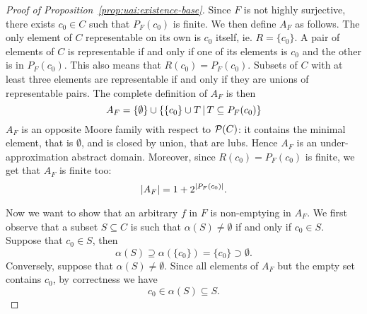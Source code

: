 \begin{proof}[Proof of Proposition~\ref{prop:uai:existence-base}]
	Since $F$ is not highly surjective, there exists $c_0 \in C$ such that $P_F(c_0)$ is finite. We then define $A_F$ as follows.
	The only element of $C$ representable on its own is $c_0$ itself, ie. $R = \{ c_0 \}$.
	A pair of elements of $C$ is representable if and only if one of its elements is $c_0$ and the other is in $P_F(c_0)$. This also means that $R(c_0) = P_F(c_0)$.
	Subsets of $C$ with at least three elements are representable if and only if they are unions of representable pairs.
	The complete definition of $A_F$ is then
	\begin{equation*}
		A_F = \{ \emptyset \} \cup \{ \{ c_0 \} \cup T \,\vert\, T \subseteq P_F(c_0) \}
	\end{equation*}
	$A_F$ is an opposite Moore family with respect to $\mathcal{P}(C)$: it contains the minimal element, that is $\emptyset$, and is closed by union, that are lubs. Hence $A_F$ is an under-approximation abstract domain.
	Moreover, since $R(c_0) = P_F(c_0)$ is finite, we get that $A_F$ is finite too:
	\begin{equation*}
		\lvert A_F\rvert = 1 + 2^{\lvert P_F(c_0)\rvert} .
	\end{equation*}

	Now we want to show that an arbitrary $f$ in $F$ is non-emptying in $A_F$.
	We first observe that a subset $S \subseteq C$ is such that $\alpha(S) \neq \emptyset$ if and only if $c_0 \in S$. Suppose that $c_0 \in S$, then
	\begin{equation*}
		\alpha(S) \supseteq \alpha(\{ c_0 \}) = \{ c_0 \} \supset \emptyset .
	\end{equation*}
	Conversely, suppose that $\alpha(S) \neq \emptyset$. Since all elements of $A_F$ but the empty set contains $c_0$, by correctness we have
	\begin{equation*}
		c_0 \in \alpha(S) \subseteq S .
	\end{equation*}


\end{proof}

